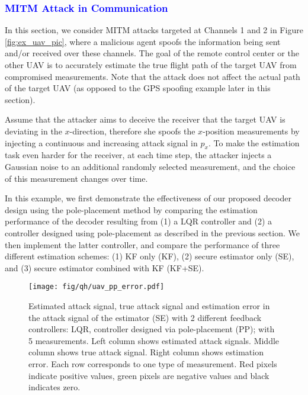 \documentclass[12pt, conference, a4paper, twoside]{IEEEconf_mod}
\newcommand{\qie}[1]{{\normalsize{{{\color{cyan}(#1)}}}}}
\newcommand{\yh}[1]{{\normalsize{{{\color{magenta}(#1)}}}}}
\begin{document}
\subsubsection{\textcolor{blue}{MITM Attack in Communication}} \label{sec:uav_utm}
In this section, we consider MITM attacks targeted at Channels 1 and 2 in Figure \ref{fig:ex_uav_pic}, where a malicious agent spoofs the information being sent and/or received over these channels. 
The goal of the remote control center or the other UAV is to accurately estimate the true flight path of the target UAV from compromised measurements. 
Note that the attack does not affect the actual path of the target UAV (as opposed to the GPS spoofing example later in this section).

Assume that the attacker aims to deceive the receiver that the target UAV is deviating in the $x$-direction, therefore she spoofs the $x$-position measurements by injecting a continuous and increasing attack signal in $p_x$.
To make the estimation task even harder for the receiver, at each time step, the attacker injects a Gaussian noise to an additional randomly selected measurement, and the choice of this measurement changes over time. 

In this example, we first demonstrate the effectiveness of our proposed decoder design using the pole-placement method by comparing the estimation performance of the decoder resulting from (1) a LQR controller and (2) a controller designed using pole-placement as described in the previous section.
We then implement the latter controller, and compare the performance of three different estimation schemes: (1) KF only (KF), (2) secure estimator only (SE), and (3) secure estimator combined with KF (KF+SE). 

\begin{figure}
\center
\texttt{[image: fig/qh/uav\_pp\_error.pdf]}
\caption{Estimated attack signal, true attack signal and estimation error in the attack signal of the estimator (SE) with 2 different feedback controllers: LQR, controller designed via pole-placement (PP); with 5 measurements. Left column shows estimated attack signals. Middle column shows true attack signal. Right column shows estimation error. Each row corresponds to one type of measurement. Red pixels indicate positive values, green pixels are negative values and black indicates zero. }
\label{fig:ex_pp_err}
\end{figure}
\end{document}
